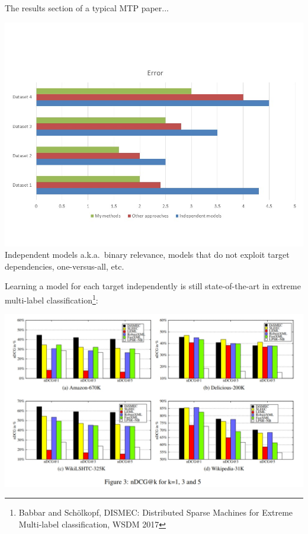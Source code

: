 \documentclass[]{beamer}
\begin{document}
\begin{frame}{The results section of a typical MTP paper...}
\begin{center}
\includegraphics[scale=0.45, trim = 0 50 0 100,clip]{Figures/barplots} \\

Independent models a.k.a.\ binary relevance, models that do not exploit target dependencies, one-versus-all, etc.
\end{center}
\end{frame}


\begin{frame}

\begin{center}
Learning a model for each target independently is still state-of-the-art in extreme multi-label classification\footnote{Babbar and Sch\"olkopf, DISMEC: Distributed Sparse Machines for Extreme Multi-label classification, WSDM 2017}:

\includegraphics[scale=0.3]{Figures/dismec} 
\end{center}

\end{frame}
\end{document}

